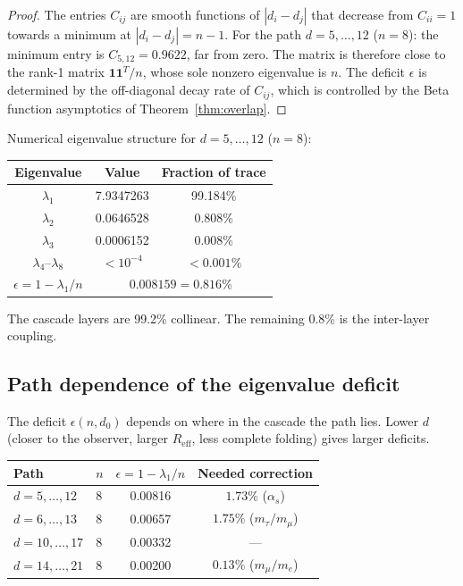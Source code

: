 \documentclass[12pt,a4paper]{article}
\theoremstyle{remark}
\begin{document}
\begin{proof}
The entries $C_{ij}$ are smooth functions of $|d_i - d_j|$ that decrease from $C_{ii} = 1$ towards a minimum at $|d_i - d_j| = n - 1$. For the path $d = 5, \ldots, 12$ ($n = 8$): the minimum entry is $C_{5,12} = 0.9622$, far from zero. The matrix is therefore close to the rank-1 matrix $\mathbf{1}\mathbf{1}^T/n$, whose sole nonzero eigenvalue is $n$. The deficit $\epsilon$ is determined by the off-diagonal decay rate of $C_{ij}$, which is controlled by the Beta function asymptotics of Theorem~\ref{thm:overlap}.
\end{proof}

\noindent Numerical eigenvalue structure for $d = 5, \ldots, 12$ ($n = 8$):

\begin{center}
\renewcommand{\arraystretch}{1.2}
\begin{tabular}{ccc}
\toprule
Eigenvalue & Value & Fraction of trace \\
\midrule
$\lambda_1$ & 7.9347263 & 99.184\% \\
$\lambda_2$ & 0.0646528 & 0.808\% \\
$\lambda_3$ & 0.0006152 & 0.008\% \\
$\lambda_4$--$\lambda_8$ & $< 10^{-4}$ & $< 0.001\%$ \\
\midrule
$\epsilon = 1 - \lambda_1/n$ & \multicolumn{2}{c}{$0.008159 = 0.816\%$} \\
\bottomrule
\end{tabular}
\end{center}

\noindent The cascade layers are 99.2\% collinear. The remaining 0.8\% is the inter-layer coupling.

\subsection{Path dependence of the eigenvalue deficit}

The deficit $\epsilon(n, d_0)$ depends on where in the cascade the path lies. Lower $d$ (closer to the observer, larger $R_{\mathrm{eff}}$, less complete folding) gives larger deficits.

\begin{center}
\renewcommand{\arraystretch}{1.2}
\begin{tabular}{llcc}
\toprule
Path & $n$ & $\epsilon = 1 - \lambda_1/n$ & Needed correction \\
\midrule
$d = 5, \ldots, 12$ & 8 & 0.00816 & $1.73\%$ ($\alpha_s$) \\
$d = 6, \ldots, 13$ & 8 & 0.00657 & $1.75\%$ ($m_\tau/m_\mu$) \\
$d = 10, \ldots, 17$ & 8 & 0.00332 & --- \\
$d = 14, \ldots, 21$ & 8 & 0.00200 & $0.13\%$ ($m_\mu/m_e$) \\
\bottomrule
\end{tabular}
\end{center}
\end{document}

